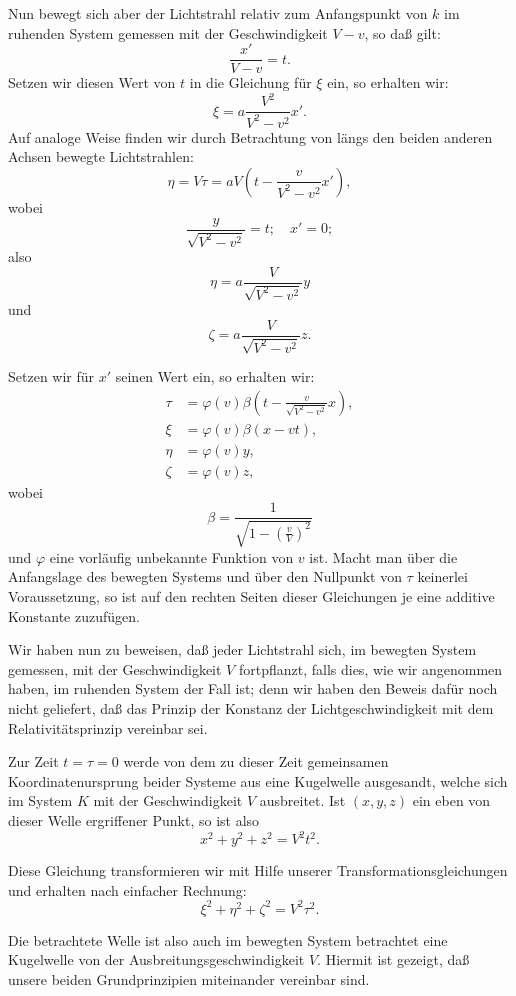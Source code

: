 \documentclass[17pt]{webarticle}       %
\begin{document}
Nun bewegt sich aber der Lichtstrahl relativ zum Anfangspunkt von \( k \) im ruhenden System gemessen mit der Geschwindigkeit \( V - v \), so daß gilt:
\[
\frac{x'}{V - v} = t.
\]
Setzen wir diesen Wert von \( t \) in die Gleichung für \( \xi \) ein, so erhalten wir:
\[
\xi = a \frac{V^2}{V^2 - v^2} x'.
\]
Auf analoge Weise finden wir durch Betrachtung von längs den beiden anderen Achsen bewegte Lichtstrahlen:
\[
\eta = V \tau = a V \left( t - \frac{v}{V^2 - v^2} x' \right),
\]
wobei
\[
\frac{y}{\sqrt{V^2 - v^2}} = t; \quad x' = 0;
\]
also
\[
\eta = a \frac{V}{\sqrt{V^2 - v^2}} y
\]
und
\[
\zeta = a \frac{V}{\sqrt{V^2 - v^2}} z.
\]

Setzen wir für \( x' \) seinen Wert ein, so erhalten wir:
\[
\begin{aligned}
\tau &= \varphi(v) \beta \left( t - \frac{v}{\sqrt{V^2 - v^2}} x \right),
\\
\xi &= \varphi(v) \beta (x - vt),
\\
\eta &= \varphi(v) y,
\\
\zeta &= \varphi(v) z,
\end{aligned}
\]
wobei
\[
\beta = \frac{1}{\sqrt{1 - \left( \frac{v}{V} \right)^2}}
\]
und \(\varphi\) eine vorläufig unbekannte Funktion von \( v \) ist. Macht man über die Anfangslage des bewegten Systems und über den Nullpunkt von \( \tau \) keinerlei Voraussetzung, so ist auf den rechten Seiten dieser Gleichungen je eine additive Konstante zuzufügen.

Wir haben nun zu beweisen, daß jeder Lichtstrahl sich, im bewegten System gemessen, mit der Geschwindigkeit \( V \) fortpflanzt, falls dies, wie wir angenommen haben, im ruhenden System der Fall ist; denn wir haben den Beweis dafür noch nicht geliefert, daß das Prinzip der Konstanz der Lichtgeschwindigkeit mit dem Relativitätsprinzip vereinbar sei.

Zur Zeit \( t = \tau = 0 \) werde von dem zu dieser Zeit gemeinsamen Koordinatenursprung beider Systeme aus eine Kugelwelle ausgesandt, welche sich im System \( K \) mit der Geschwindigkeit \( V \) ausbreitet. Ist \( (x, y, z) \) ein eben von dieser Welle ergriffener Punkt, so ist also
\[
x^2 + y^2 + z^2 = V^2 t^2.
\]

Diese Gleichung transformieren wir mit Hilfe unserer Transformationsgleichungen und erhalten nach einfacher Rechnung:
\[
\xi^2 + \eta^2 + \zeta^2 = V^2 \tau^2.
\]

Die betrachtete Welle ist also auch im bewegten System betrachtet eine Kugelwelle von der Ausbreitungsgeschwindigkeit \( V \). Hiermit ist gezeigt, daß unsere beiden Grundprinzipien miteinander vereinbar sind.
\end{document}
